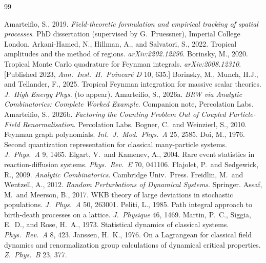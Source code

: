 \documentclass[11pt,a4paper]{article}
\theoremstyle{plain}
\theoremstyle{definition}
\begin{document}
\begin{thebibliography}{99}

 Amarteifio, S., 2019. \textit{Field-theoretic formulation and empirical tracking of spatial processes}. PhD dissertation (supervised by G.~Pruessner), Imperial College London.
 Arkani-Hamed, N., Hillman, A., and Salvatori, S., 2022. Tropical amplitudes and the method of regions. \textit{arXiv:2202.12296}.
 Borinsky, M., 2020. Tropical Monte Carlo quadrature for Feynman integrals. \textit{arXiv:2008.12310}. [Published 2023, \textit{Ann.\ Inst.\ H.\ Poincar\'e D} 10, 635.]
 Borinsky, M., Munch, H.J., and Tellander, F., 2025. Tropical Feynman integration for massive scalar theories. \textit{J.\ High Energy Phys.} (to appear).
 Amarteifio, S., 2026a. \textit{BRW via Analytic Combinatorics: Complete Worked Example}. Companion note, Percolation Labs.
 Amarteifio, S., 2026b. \textit{Factoring the Counting Problem Out of Coupled Particle-Field Renormalisation}. Percolation Labs.
 Bogner, C.\ and Weinzierl, S., 2010. Feynman graph polynomials. \textit{Int.\ J.\ Mod.\ Phys.\ A} 25, 2585.
 Doi, M., 1976. Second quantization representation for classical many-particle systems. \textit{J.\ Phys.\ A} 9, 1465.
 Elgart, V.\ and Kamenev, A., 2004. Rare event statistics in reaction-diffusion systems. \textit{Phys.\ Rev.\ E} 70, 041106.
 Flajolet, P.\ and Sedgewick, R., 2009. \textit{Analytic Combinatorics}. Cambridge Univ.\ Press.
 Freidlin, M.\ and Wentzell, A., 2012. \textit{Random Perturbations of Dynamical Systems}. Springer.
 Assaf, M.\ and Meerson, B., 2017. WKB theory of large deviations in stochastic populations. \textit{J.\ Phys.\ A} 50, 263001.
 Peliti, L., 1985. Path integral approach to birth-death processes on a lattice. \textit{J.\ Physique} 46, 1469.
 Martin, P.~C., Siggia, E.~D., and Rose, H.~A., 1973. Statistical dynamics of classical systems. \textit{Phys.\ Rev.\ A} 8, 423.
 Janssen, H.~K., 1976. On a Lagrangean for classical field dynamics and renormalization group calculations of dynamical critical properties. \textit{Z.\ Phys.\ B} 23, 377.

\end{thebibliography}
\end{document}
